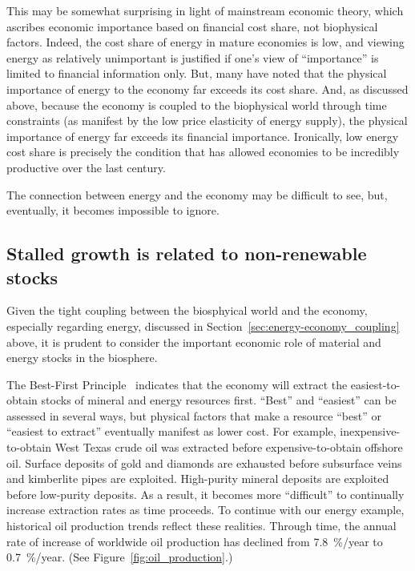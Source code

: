 This may be somewhat surprising in light of mainstream economic theory, 
which ascribes economic importance 
based on financial cost share, 
not biophysical factors. 
Indeed, the cost share of energy in mature economies is low, 
and viewing energy as relatively unimportant is justified if
one's view of ``importance'' is limited to financial information only.
But, many have noted that the physical importance of energy to the economy 
far exceeds its cost share.\cite{Ayres:2013aa}
And, as discussed above, because the economy is coupled 
to the biophysical world through time constraints (as manifest 
by the low price elasticity of energy supply), 
the physical importance of energy far exceeds its financial importance.
Ironically, low energy cost share 
is precisely the condition that 
has allowed economies to be incredibly productive over the last century.

The connection between energy and the economy may be difficult to see, 
but, eventually, it becomes impossible to ignore.


\subsection{Stalled growth is related to non-renewable stocks}
\label{sec:stall_non-renewable_stocks}

Given the tight coupling between the biosphyical world and the economy,
especially regarding energy,
discussed in Section~\ref{sec:energy-economy_coupling} above,
it is prudent to consider the important economic role of
material and energy stocks in the biosphere.

The Best-First Principle~\cite{Cleveland:2008aa}
indicates that the economy will extract the easiest-to-obtain 
stocks of mineral and energy resources first.
``Best'' and ``easiest'' can be assessed in several ways, 
but physical factors that make a resource ``best'' or ``easiest to extract'' 
eventually manifest as lower cost.
For example, inexpensive-to-obtain West Texas crude oil was extracted
before expensive-to-obtain offshore oil. 
Surface deposits of gold and diamonds are exhausted before subsurface
veins and kimberlite pipes are exploited.
High-purity mineral deposits are exploited before low-purity deposits.
As a result, it becomes more ``difficult'' to continually increase
extraction rates as time proceeds.
To continue with our energy example,
historical oil production trends reflect these realities.
Through time, the annual rate of increase of worldwide oil production
has declined from 7.8~\%/year to 0.7~\%/year.
(See Figure~\ref{fig:oil_production}.)

